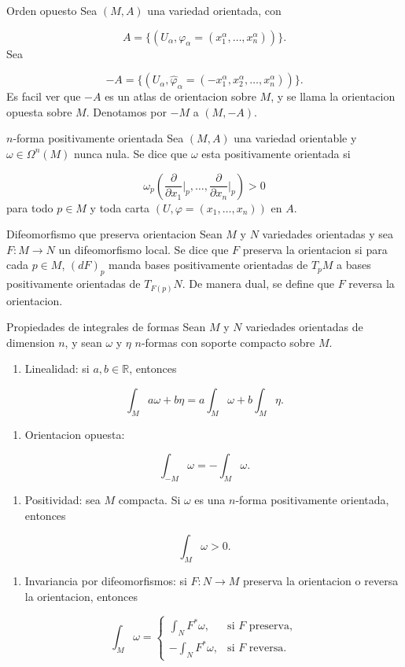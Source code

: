 \begin{bookdefinition}{Orden opuesto}
Sea $(M,A)$ una variedad orientada, con

\[
A=\{(U_\alpha,\varphi_\alpha=(x_1^\alpha,\ldots,x_n^\alpha))\}.
\]
Sea

\[
-A=\{(U_\alpha,\widehat\varphi_\alpha=(-x_1^\alpha,x_2^\alpha,\ldots,x_n^\alpha))\}.
\]
Es facil ver que $-A$ es un atlas de orientacion sobre $M$, y se llama la orientacion opuesta sobre $M$. Denotamos por $-M$ a $(M,-A)$.

\end{bookdefinition}
\begin{bookdefinition}{$n$-forma positivamente orientada}
Sea $(M,A)$ una variedad orientable y $\omega\in\Omega^n(M)$ nunca nula. Se dice que $\omega$ esta positivamente orientada si

\[
\omega_p\left(\frac{\partial}{\partial x_1}\bigg|_p,\ldots,\frac{\partial}{\partial x_n}\bigg|_p\right)>0
\]
para todo $p\in M$ y toda carta $(U,\varphi=(x_1,\ldots,x_n))$ en $A$.

\end{bookdefinition}
\label{blk:46786b}
\begin{bookdefinition}{Difeomorfismo que preserva orientacion}
Sean $M$ y $N$ variedades orientadas y sea $F:M\to N$ un difeomorfismo local. Se dice que $F$ preserva la orientacion si para cada $p\in M$, $(dF)_p$ manda bases positivamente orientadas de $T_pM$ a bases positivamente orientadas de $T_{F(p)}N$. De manera dual, se define que $F$ reversa la orientacion.

\end{bookdefinition}
\begin{bookproposition}{Propiedades de integrales de formas}
Sean $M$ y $N$ variedades orientadas de dimension $n$, y sean $\omega$ y $\eta$ $n$-formas con soporte compacto sobre $M$.

\begin{enumerate}[start=2]
\item Linealidad: si $a,b\in\mathbb R$, entonces
\end{enumerate}
\[
\int_Ma\omega+b\eta=a\int_M\omega+b\int_M\eta.
\]
\begin{enumerate}[start=3]
\item Orientacion opuesta:
\end{enumerate}
\[
\int_{-M}\omega=-\int_M\omega.
\]
\begin{enumerate}[start=4]
\item Positividad: sea $M$ compacta. Si $\omega$ es una $n$-forma positivamente orientada, entonces
\end{enumerate}
\[
\int_M\omega>0.
\]
\begin{enumerate}[start=5]
\item Invariancia por difeomorfismos: si $F:N\to M$ preserva la orientacion o reversa la orientacion, entonces
\end{enumerate}
\[
\int_M\omega=
\begin{cases}
\int_NF^*\omega,&\text{si }F\text{ preserva},\\
-\int_NF^*\omega,&\text{si }F\text{ reversa}.
\end{cases}
\]
\end{bookproposition}
